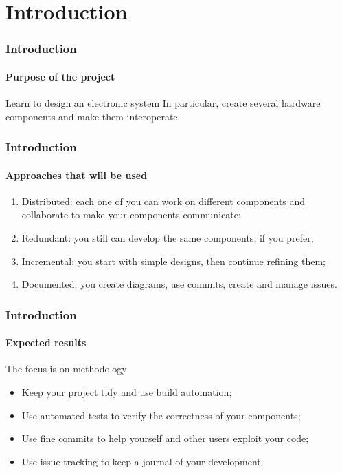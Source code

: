 \section{Introduction}

\begin{frame}
\frametitle{Introduction}
\framesubtitle{Purpose of the project}

\begin{block}{Learn to design an electronic system}
In particular, create several hardware components and make them interoperate.
\end{block}
\end{frame}

\begin{frame}
\frametitle{Introduction}
\framesubtitle{Approaches that will be used}

\begin{enumerate}
\item Distributed: each one of you can work on different components and collaborate to make your components communicate;
\pause
\item Redundant: you still can develop the same components, if you prefer;
\pause
\item Incremental: you start with simple designs, then continue refining them;
\pause
\item Documented: you create diagrams, use commits, create and manage issues.
\end{enumerate}
\end{frame}

\begin{frame}
\frametitle{Introduction}
\framesubtitle{Expected results}

\begin{block}{The focus is on methodology}
\begin{itemize}
\item Keep your project tidy and use build automation;
\item Use automated tests to verify the correctness of your components;
\item Use fine commits to help yourself and other users exploit your code;
\item Use issue tracking to keep a journal of your development.
\end{itemize}
\end{block}
\end{frame}

